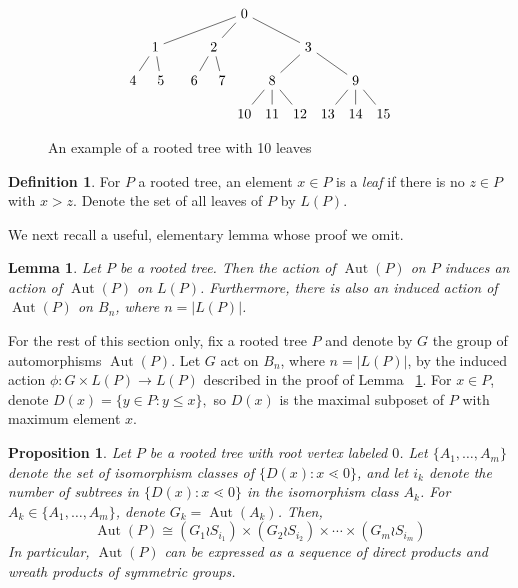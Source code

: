 \documentclass[smallextended, envcountsame, numbook]{svjour3}
\theoremstyle{plain}
\newtheorem{prop}[thm]{Proposition}
\newtheorem{lem}[thm]{Lemma}
\theoremstyle{definition}
\newtheorem{defn}[thm]{Definition}
\theoremstyle{remark}
\numberwithin{equation}{section}
\newcommand\Aut{\operatorname{Aut}}
\begin{document}
\begin{figure}[h!]
\[\begin{tikzpicture}[scale=.7]
  \node (0) at (-4,0) {$4$};
  \node (1) at (-3,0) {$5$};
  \node (2) at (-1.8,0) {$6$};
  \node (3) at (-0.8,0) {$7$};
    \node (4) at (0,-1.2) {$10$};
  \node (5) at (1,-1.2) {$11$};
  \node (6) at (2,-1.2) {$12$};
  \node (7) at (3,-1.2) {$13$};
  \node (8) at (4,-1.2) {$14$};
  \node (9) at (5,-1.2) {$15$};
  \node (10) at (1, 0) {$8$};
  \node (11) at (4,0) {$9$};
    \node (12) at (-3.2,1.2) {$1$};
  \node (13) at (-1.1,1.2) {$2$};
  \node (14) at (2.3,1.2) {$3$};
  \node (15) at (0,2.4) {$0$};
 \draw (0)--(12);
  \draw (1)--(12);
  \draw (2)--(13);
  \draw (3)--(13);
  \draw (4)--(10);
  \draw (5)--(10);
  \draw (6)--(10);
  \draw (7)--(11);
  \draw (8)--(11);
  \draw (9)--(11);
  \draw (10)--(14);
  \draw (11)--(14);
  \draw (12)--(15);
  \draw (13)--(15);
  \draw (14)--(15);
\end{tikzpicture}\]
\caption{\label{fig:tree2} An example of a rooted tree with 10  leaves}
\end{figure}

\begin{defn}
For $P$ a rooted tree, an element $x \in P$ is a {\it leaf} if there is no $z \in P$ with $x > z$. Denote the set of all leaves of $P$ by $L(P)$.
\end{defn}

We next recall a useful, elementary lemma whose proof we omit.

\begin{lem}
\label{lem:induced_tree_action}
Let $P$ be a rooted tree. Then the action of $\Aut(P)$ on $P$ induces an action of $\Aut(P)$ on $L(P)$. Furthermore, there is also an induced action of $\Aut(P)$ on $B_n$, where $n = |L(P)|$. 
\end{lem}

For the rest of this section only, fix a rooted tree $P$ and denote by $G$ the group of automorphisms $\Aut(P)$. Let $G$ act on $B_n$, where $n = |L(P)|$, by the induced action $\phi\colon G \times L(P) \rightarrow L(P)$ described in the proof of Lemma ~\ref{lem:induced_tree_action}.
For $x \in P$, denote $D(x) = \{y \in P\colon y \leq x\},$ so $D(x)$ is the maximal subposet of $P$ with maximum element $x$.

\begin{prop}
\label{prop:automorphism_trees}
Let $P$ be a rooted tree with root vertex labeled $0$. Let $\{A_1,\ldots,A_m\}$ denote the set of isomorphism classes of $\{D(x)\colon x\lessdot 0\}$, and let $i_k$ denote the number of subtrees in $\{D(x)\colon x\lessdot 0\}$ in the isomorphism class $A_k$. For $A_k \in \{A_1,\ldots,A_m\}$, denote $G_k = \Aut(A_k)$. Then, 
\begin{equation}
\label{eq:level_expansion}
\Aut(P) \cong (G_1 \wr S_{i_1}) \times (G_2 \wr S_{i_2}) \times \cdots \times (G_m\wr S_{i_m})
\end{equation}
In particular, $\Aut(P)$ can be expressed as a sequence of direct products and wreath products of symmetric groups.
\end{prop}
\end{document}
